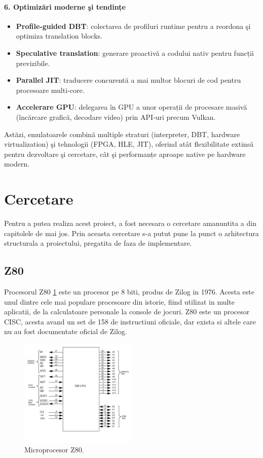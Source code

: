 \documentclass[titlepage,12pt]{article}
\begin{document}
\paragraph{6. Optimizări moderne şi tendințe}
\begin{itemize}
\item \textbf{Profile‑guided DBT}: colectarea de profiluri runtime pentru a reordona şi optimiza translation blocks.
\item \textbf{Speculative translation}: generare proactivă a codului nativ pentru funcții previzibile.
\item \textbf{Parallel JIT}: traducere concurentă a mai multor blocuri de cod pentru procesoare multi‑core.
\item \textbf{Accelerare GPU}: delegarea în GPU a unor operații de procesare masivă (încărcare grafică, decodare video) prin API‑uri precum Vulkan.
\end{itemize}

Astăzi, emulatoarele combină multiple straturi (interpreter, DBT, hardware virtualization) şi tehnologii (FPGA, HLE, JIT), oferind atât flexibilitate extinsă pentru dezvoltare şi cercetare, cât şi performanțe aproape native pe hardware modern.

\clearpage
\section{Cercetare}
Pentru a putea realiza acest proiect, a fost necesara o cercetare amanuntita a din capitolele de mai jos.
Prin aceasta cercetare s-a putut pune la punct o arhitectura structurala a proiectului, pregatita de faza de implementare.

\subsection{\ac {Z80}}
Procesorul Z80 \cref{fig:z80} este un procesor pe 8 biti, produs de Zilog in 1976. Acesta este unul dintre cele mai populare procesoare din istorie, fiind utilizat in multe aplicatii, de la calculatoare personale la console de jocuri.
\ac {Z80} este un procesor CISC, acesta avand un set de 158 de instructiuni oficiale, dar exista si altele care nu au fost documentate oficial de Zilog.

\begin{figure}[H]
\centering
\includegraphics[width=0.5\textwidth]{images/z80.jpg}
\caption{Microprocesor Z80.}
\label{fig:z80}
\end{figure}
\end{document}
